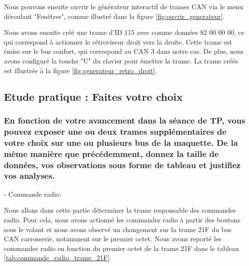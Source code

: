 \documentclass{rapportECC}
\begin{document}
Nous pouvons ensuite ouvrir le générateur interactif de trames CAN via le menu déroulant "Fenêtres", comme illustré dans la figure \ref{fig:ouvrir_generateur}.


Nous avons ensuite créé une trame d'ID 115 avec comme données 82 00 00 00, ce qui correspond à actionner le rétroviseur droit vers la droite. Cette trame est émise sur le bus confort, qui correspond au CAN 3 dans notre cas. De plus, nous avons configuré la touche "U" du clavier pour émettre la trame. La trame créée est illustrée à la figure \ref{fig:generateur_retro_droit}.



\subsection{Etude pratique : Faites votre choix}

\subsubsection*{En fonction de votre avancement dans la séance de TP, vous pouvez exposer une ou deux trames supplémentaires de votre choix sur une ou plusieurs bus de la maquette. De la même manière que précédemment, donnez la taille de données, vos observations sous forme de tableau et justifiez vos analyses.}

- Commande radio:

Nous allons dans cette partie déterminer la trame responsable des commandes radio. Pour cela, nous avons actionné les commandes radio à partir des boutons sous le volant et nous avons observé un changement sur la trame 21F du bus CAN carrosserie, notamment sur le premier octet. Nous avons reporté les commandes radio en fonction du premier octet de la trame 21F dans le tableau \ref{tab:commande_radio_trame_21F}.
\end{document}
